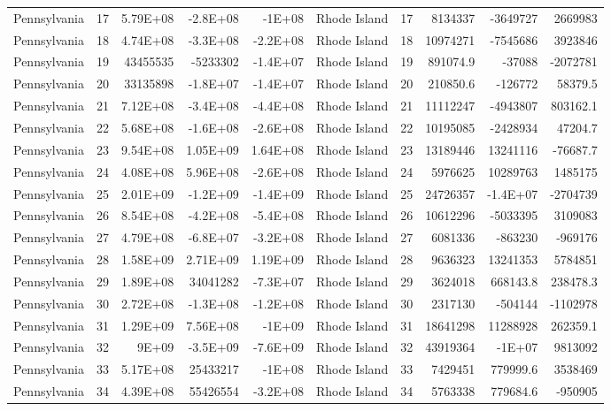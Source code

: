 \begin{table}[]
\begin{tabular}{lrrrrlrrrr}
		Pennsylvania &  17 & 5.79E+08 & -2.8E+08 & -1E+08 & Rhode Island &  17 & 8134337 & -3649727 & 2669983 \\
		Pennsylvania &  18 & 4.74E+08 & -3.3E+08 & -2.2E+08 & Rhode Island &  18 & 10974271 & -7545686 & 3923846 \\
		Pennsylvania &  19 & 43455535 & -5233302 & -1.4E+07 & Rhode Island &  19 & 891074.9 & -37088 & -2072781 \\
		Pennsylvania &  20 & 33135898 & -1.8E+07 & -1.4E+07 & Rhode Island &  20 & 210850.6 & -126772 & 58379.5 \\
		Pennsylvania &  21 & 7.12E+08 & -3.4E+08 & -4.4E+08 & Rhode Island &  21 & 11112247 & -4943807 & 803162.1 \\
		Pennsylvania &  22 & 5.68E+08 & -1.6E+08 & -2.6E+08 & Rhode Island &  22 & 10195085 & -2428934 & 47204.7 \\
		Pennsylvania &  23 & 9.54E+08 & 1.05E+09 & 1.64E+08 & Rhode Island &  23 & 13189446 & 13241116 & -76687.7 \\
		Pennsylvania &  24 & 4.08E+08 & 5.96E+08 & -2.6E+08 & Rhode Island &  24 & 5976625 & 10289763 & 1485175 \\
		Pennsylvania &  25 & 2.01E+09 & -1.2E+09 & -1.4E+09 & Rhode Island &  25 & 24726357 & -1.4E+07 & -2704739 \\
		Pennsylvania &  26 & 8.54E+08 & -4.2E+08 & -5.4E+08 & Rhode Island &  26 & 10612296 & -5033395 & 3109083 \\
		Pennsylvania &  27 & 4.79E+08 & -6.8E+07 & -3.2E+08 & Rhode Island &  27 & 6081336 & -863230 & -969176 \\
		Pennsylvania &  28 & 1.58E+09 & 2.71E+09 & 1.19E+09 & Rhode Island &  28 & 9636323 & 13241353 & 5784851 \\
		Pennsylvania &  29 & 1.89E+08 & 34041282 & -7.3E+07 & Rhode Island &  29 & 3624018 & 668143.8 & 238478.3 \\
		Pennsylvania &  30 & 2.72E+08 & -1.3E+08 & -1.2E+08 & Rhode Island &  30 & 2317130 & -504144 & -1102978 \\
		Pennsylvania &  31 & 1.29E+09 & 7.56E+08 & -1E+09 & Rhode Island &  31 & 18641298 & 11288928 & 262359.1 \\
		Pennsylvania &  32 & 9E+09 & -3.5E+09 & -7.6E+09 & Rhode Island &  32 & 43919364 & -1E+07 & 9813092 \\
		Pennsylvania &  33 & 5.17E+08 & 25433217 & -1E+08 & Rhode Island &  33 & 7429451 & 779999.6 & 3538469 \\
		Pennsylvania &  34 & 4.39E+08 & 55426554 & -3.2E+08 & Rhode Island &  34 & 5763338 & 779684.6 & -950905
	\end{tabular}
\end{table}

